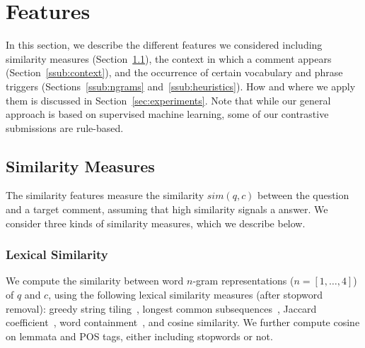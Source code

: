 \section{Features}
\label{sec:approach}

In this section, we describe the different features we considered including 
similarity measures (Section~\ref{sub:sim}), the context in which a comment 
appears (Section~\ref{ssub:context}), and the occurrence of certain vocabulary 
and phrase triggers (Sections~\ref{ssub:ngrams} and~\ref{ssub:heuristics}). How 
and where we apply them is discussed in Section~\ref{sec:experiments}.
Note that while our general approach is based on supervised machine learning,
some of our contrastive submissions are rule-based.

% 

\subsection{Similarity Measures}
\label{sub:sim}

The similarity features measure the similarity $sim(q,c)$
between the question and a target comment,
assuming that high similarity signals a \good answer.
We consider three kinds of similarity measures, which we describe below.

\subsubsection{Lexical Similarity}

We compute the similarity between word $n$-gram representations 
($n=[1,\ldots,4]$) of $q$ and $c$,
using the following lexical similarity measures
(after stopword removal):
greedy string tiling~\cite{Wise:1996},
longest common subsequences~\cite{Allison:1986},
Jaccard coefficient~\cite{Jaccard:1901},
word containment~\cite{Lyon:2001}, and cosine similarity.
We further compute cosine on lemmata and POS tags, either including stopwords or not.

